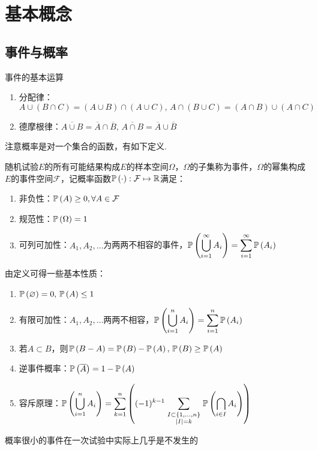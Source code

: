 
\section{基本概念}
\subsection{事件与概率}
\begin{proposition}事件的基本运算
	\begin{enumerate}
		\itemsep -3pt
		\item 分配律：$A\cup(B\cap C)=(A\cup B)\cap(A\cup C),\,A\cap(B\cup C)=(A\cap B)\cup(A\cap C)$
		\item 德摩根律：$\overline{A\cup B}=\overline{A}\cap\overline{B},\,\overline{A\cap B}=\overline{A}\cup\overline{B}$
	\end{enumerate}
\end{proposition}
注意概率是对一个集合的函数，有如下定义.
\begin{definition}[概率]
	随机试验$E$的所有可能结果构成$E$的样本空间$\Omega$，$\Omega$的子集称为事件，$\Omega$的幂集构成$E$的事件空间$\mathcal{F}$，记概率函数$\mathbb{P}\left(\cdot\right):\mathcal{F}\mapsto\mathbb{R}$满足：
	\begin{enumerate}
		\itemsep -3pt
		\item 非负性：$\mathbb{P}\left(A\right)\geq 0,\forall A\in\mathcal{F}$
		\item 规范性：$\mathbb{P}\left(\Omega\right)=1$
		\item 可列可加性：$A_1,A_2,\ldots$为两两不相容的事件，$\displaystyle \mathbb{P}\left(\bigcup_{i=1}^\infty A_i\right)=\sum_{i=1}^\infty \mathbb{P}\left(A_i\right)$
	\end{enumerate}
\end{definition}
由定义可得一些基本性质：
\begin{enumerate}
	\itemsep -3pt
	\item $\mathbb{P}\left(\varnothing\right)=0,\,\mathbb{P}\left(A\right)\leq 1$
	\item 有限可加性：$A_1,A_2,\ldots$两两不相容，$\displaystyle \mathbb{P}\left(\bigcup_{i=1}^n A_i\right)=\sum_{i=1}^n \mathbb{P}\left(A_i\right)$
	\item 若$A\subset B$，则$\mathbb{P}\left(B-A\right)=\mathbb{P}\left(B\right)-\mathbb{P}\left(A\right),\,\mathbb{P}\left(B\right)\geq \mathbb{P}\left(A\right)$
	\item 逆事件概率：$\mathbb{P}\left(\overline{A}\right)=1-\mathbb{P}\left(A\right)$
	\item 容斥原理：$\displaystyle \mathbb{P}\left(\bigcup _{{i=1}}^{n}A_{i}\right)=\sum _{{k=1}}^{n}\left((-1)^{{k-1}}\sum _{{\scriptstyle I\subset \{1,\ldots ,n\} \atop \scriptstyle |I|=k}}\mathbb{P}\left(\bigcap _{{i\in I}}A_{i}\right)\right)$
\end{enumerate}
\begin{theorem}[实际推断原理]
概率很小的事件在一次试验中实际上几乎是不发生的
\end{theorem}

